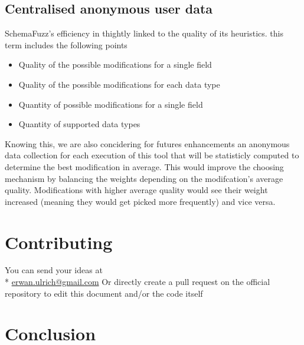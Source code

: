 \documentclass{article}
\begin{document}
		\subsection{Centralised anonymous user data}
SchemaFuzz's efficiency in thightly linked to the quality of its heuristics. this term includes the following points 
		\begin{itemize}
		\item{Quality of the possible modifications for a single field}
		\item{Quality of the possible modifications for each data type}
		\item{Quantity of possible modifications for a single field}
		\item{Quantity of supported data types}
		\end{itemize}
Knowing this, we are also concidering for futures enhancements an anonymous data collection  for each execution of this tool that will be statisticly computed to determine the best modification in average. This would improve the choosing mechanism by balancing the weights  depending on the modifcation's average quality. Modifications with higher average quality would see their weight increased (meaning they would get picked more frequently) and vice versa. 			
	\section{Contributing}
You can send your ideas at  \\*
		\url{erwan.ulrich@gmail.com}
Or directly create a pull request on the official repository to edit this document and/or the code itself
	\section{Conclusion}
\end{document}
